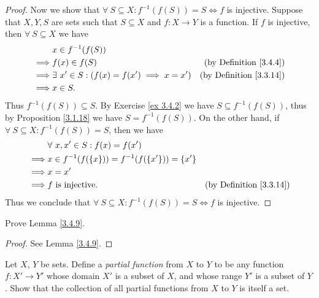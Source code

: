 \begin{proof}
    Now we show that \(\forall\ S \subseteq X : f^{-1}(f(S)) = S \iff f\) is injective.
    Suppose that \(X, Y, S\) are sets such that \(S \subseteq X\) and \(f : X \to Y\) is a function.
    If \(f\) is injective, then \(\forall\ S \subseteq X\) we have
    \begin{align*}
                 & x \in f^{-1}(f(S))                                                                       \\
        \implies & f(x) \in f(S)                                      & \text{(by Definition \ref{3.4.4})}  \\
        \implies & \exists\ x' \in S : (f(x) = f(x') \implies x = x') & \text{(by Definition \ref{3.3.14})} \\
        \implies & x \in S.
    \end{align*}
    Thus \(f^{-1}(f(S)) \subseteq S\).
    By Exercise \ref{ex 3.4.2} we have \(S \subseteq f^{-1}(f(S))\), thus by Proposition \ref{3.1.18} we have \(S = f^{-1}(f(S))\).
    On the other hand, if \(\forall\ S \subseteq X : f^{-1}(f(S)) = S\), then we have
    \begin{align*}
                 & \forall\ x, x' \in S : f(x) = f(x')                                                       \\
        \implies & x \in f^{-1}(f(\{x\})) = f^{-1}(f(\{x'\})) = \{x'\}                                       \\
        \implies & x = x'                                                                                    \\
        \implies & f \text{ is injective}.                             & \text{(by Definition \ref{3.3.14})}
    \end{align*}
    Thus we conclude that \(\forall\ S \subseteq X : f^{-1}(f(S)) = S \iff f\) is injective.
\end{proof}

\begin{exercise}\label{ex 3.4.6}
    Prove Lemma \ref{3.4.9}.
\end{exercise}

\begin{proof}
    See Lemma \ref{3.4.9}.
\end{proof}

\begin{exercise}\label{ex 3.4.7}
    Let \(X\), \(Y\) be sets.
    Define a \emph{partial function} from \(X\) to \(Y\) to be any function \(f : X' \to Y'\) whose domain \(X'\) is a subset of \(X\), and whose range \(Y'\) is a subset of \(Y\).
    Show that the collection of all partial functions from \(X\) to \(Y\) is itself a set.
\end{exercise}

